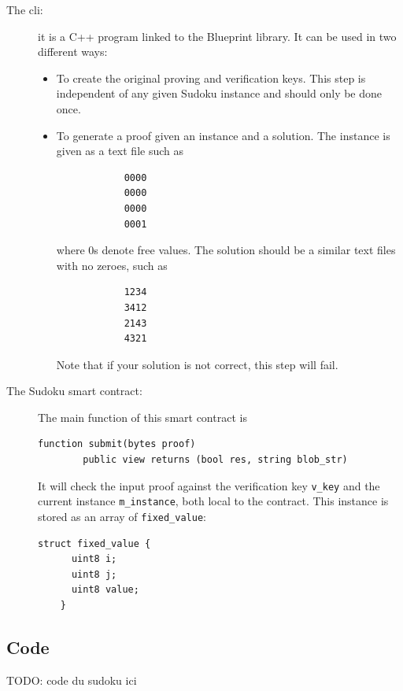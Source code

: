 \documentclass[10pt,a4paper]{article}
\begin{document}
\begin{description}
	\item[The cli:] it is a C++ program linked to the Blueprint \zksnarks{} library. It can be used in two different ways:
	\begin{itemize}
		\item To create the original proving and verification keys. This step is independent of any given Sudoku instance and should only be done once.
		\item To generate a proof given an instance and a solution. The instance is given as a text file such as

		\begin{verbatim}
			0000
			0000
			0000
			0001
		\end{verbatim}

		where $0$s denote free values. The solution should be a similar text files with no zeroes, such as

		\begin{verbatim}
			1234
			3412
			2143
			4321
		\end{verbatim}

		Note that if your solution is not correct, this step will fail.
	\end{itemize}
    \item[The Sudoku smart contract:] The main function of this smart contract is
    \begin{lstlisting}[language=Solidity]
    function submit(bytes proof)
        public view returns (bool res, string blob_str)
    \end{lstlisting}
    It will check the input proof against the verification key \lstinline[language=Solidity]|v_key| and the current instance \lstinline[language=Solidity]|m_instance|, both local to the contract. This instance is stored as an array of \lstinline[language=Solidity]|fixed_value|:
    \begin{lstlisting}[language=Solidity]
    struct fixed_value {
      uint8 i;
      uint8 j;
      uint8 value;
    }

    \end{lstlisting}
\end{description}

\subsection{Code}
\label{subsec:sudoku_code}

TODO: code du sudoku ici
\end{document}
